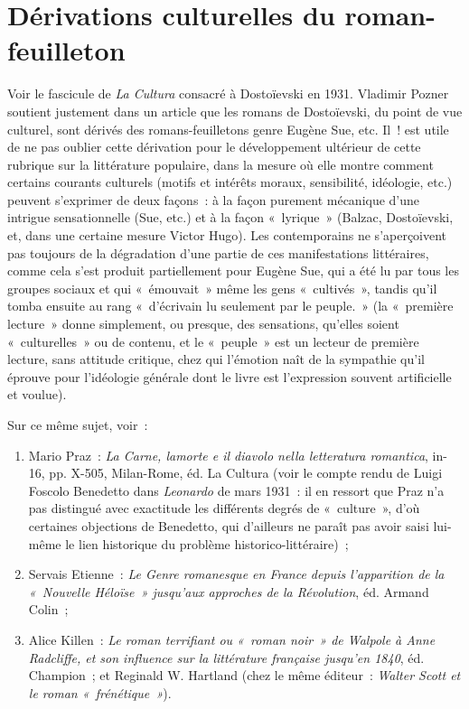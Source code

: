 \documentclass[french,twoside]{book} %
\begin{document}
\section[{Dérivations culturelles du roman-feuilleton}]{Dérivations culturelles du roman-feuilleton}
\noindent Voir le fascicule de \emph{La Cultura} consacré à Dostoïevski en 1931. Vladimir Pozner soutient justement dans un article que les romans de Dostoïevski, du point de vue culturel, sont dérivés des romans-feuilletons genre Eugène Sue, etc. Il ! est utile de ne pas oublier cette dérivation pour le développement ultérieur de cette rubrique sur la littérature populaire, dans la mesure où elle montre comment certains courants culturels (motifs et intérêts moraux, sensibilité, idéologie, etc.) peuvent s’exprimer de deux façons : à la façon purement mécanique d’une intrigue sensationnelle (Sue, etc.) et à la façon « lyrique » (Balzac, Dostoïevski, et, dans une certaine mesure Victor Hugo). Les contemporains ne s’aperçoivent pas toujours de la dégradation d’une partie de ces manifestations littéraires, comme cela s’est produit partiellement pour Eugène Sue, qui a été lu par tous les groupes sociaux et qui « émouvait » même les gens « cultivés », tandis qu’il tomba ensuite au rang « d’écrivain lu seulement par le peuple. » (la « première lecture » donne simplement, ou presque, des sensations, qu’elles soient « culturelles » ou de contenu, et le « peuple » est un lecteur de première lecture, sans attitude critique, chez qui l’émotion naît de la sympathie qu’il éprouve pour l’idéologie générale dont le livre est l’expression souvent artificielle et voulue).\par
Sur ce même sujet, voir :\par

\begin{enumerate}[itemsep=0pt,]
\item Mario Praz : \emph{La Carne, lamorte e il diavolo nella letteratura romantica}, in-16, pp. X-505, Milan-Rome, éd. La Cultura (voir le compte rendu de Luigi Foscolo Benedetto dans \emph{Leonardo} de mars 1931 : il en ressort que Praz n’a pas distingué avec exactitude les différents degrés de « culture », d’où certaines objections de Benedetto, qui d’ailleurs ne paraît pas avoir saisi lui-même le lien historique du problème historico-littéraire) ;
\item Servais Etienne : \emph{Le Genre romanesque en France depuis l’apparition de la « Nouvelle Héloïse » jusqu’aux approches de la Révolution}, éd. Armand Colin ;
\item Alice Killen : \emph{Le roman terrifiant ou « roman noir » de Walpole à Anne Radcliffe, et son influence sur la littérature française jusqu’en 1840}, éd. Champion ; et Reginald W. Hartland (chez le même éditeur : \emph{Walter Scott et le roman « frénétique »}). 
\end{enumerate}
\end{document}
